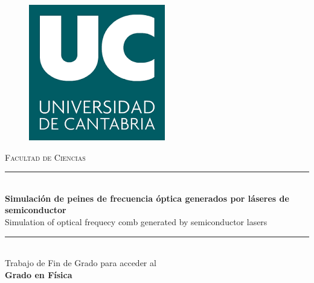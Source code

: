 \documentclass[a4paper, 11pt, oneside]{book}
\begin{document}
		\begin{titlepage} 

			\newcommand{\HRule}{\rule{\linewidth}{0.5mm}} 
			
			\center %
			
			
				
					\begin{figure}[H]
						\centering
						\includegraphics[scale=0.6]{download.png}
					\end{figure}

					\textsc{\LARGE Facultad de Ciencias}\\[1.5cm] 
			
			
			
				\HRule\\[0.4cm]
				
				{\huge\bfseries Simulación de peines de frecuencia óptica generados por láseres de semiconductor}\\[0.8cm] %

				{\huge Simulation of optical frequecy comb generated by semiconductor lasers}\\[0.4cm] %
				
				\HRule\\[1.5cm]

				{\Large Trabajo de Fin de Grado para acceder al}\\[0.4cm]

				{\LARGE\bfseries Grado en Física}\\[3cm]
			

\end{titlepage}
\end{document}
